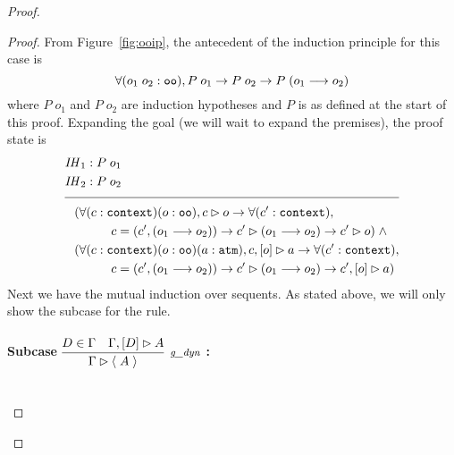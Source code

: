 \begin{proof}
\begin{proof}
From Figure~\ref{fig:ooip}, the antecedent of the  induction principle for this case is
$$
\forall (o_1 \; o_2 : \texttt{oo}), P \; o_1 \rightarrow P \; o_2 \rightarrow P \; (o_1 \longrightarrow o_2)
$$
where $P \; o_1$ and $P \; o_2$ are induction hypotheses and $P$ is as defined at the start of this proof. Expanding the goal (we will wait to expand the premises), the proof state is
\begin{align*}
\mathit{IH}_1 &: P \; o_1 \\
\mathit{IH}_2 &: P \; o_2 \\[\pfshift{}]
\cline{1-2}
(\forall & (c : \sltm{context}) (o : \sltm{oo}), \seqsl[c]{o} \rightarrow \forall (\inddyncon{} : \sltm{context}), \\
& \qquad c = (\inddyncon{}, (o_1 \longrightarrow o_2)) \rightarrow \seqsl[\inddyncon{}]{(o_1 \longrightarrow o_2)} \rightarrow \seqsl[\inddyncon{}]{o}) \; \wedge \\
(\forall & (c : \sltm{context}) (o : \sltm{oo}) (a : \sltm{atm}), \bchsl[c]{o}{a} \rightarrow \forall (\inddyncon{} : \sltm{context}), \\
& \qquad c = (\inddyncon{}, (o_1 \longrightarrow o_2)) \rightarrow \seqsl[\inddyncon{}]{(o_1 \longrightarrow o_2)} \rightarrow \bchsl[\inddyncon{}]{o}{a})
\end{align*}
Next we have the mutual induction over sequents. As stated above, we will only show the subcase for the \rlnmsinit{} rule.

\paragraph{Subcase $\vcenter{\rlsinit{}}$ :} ~\\

\bigskip


\end{proof}
\end{proof}

